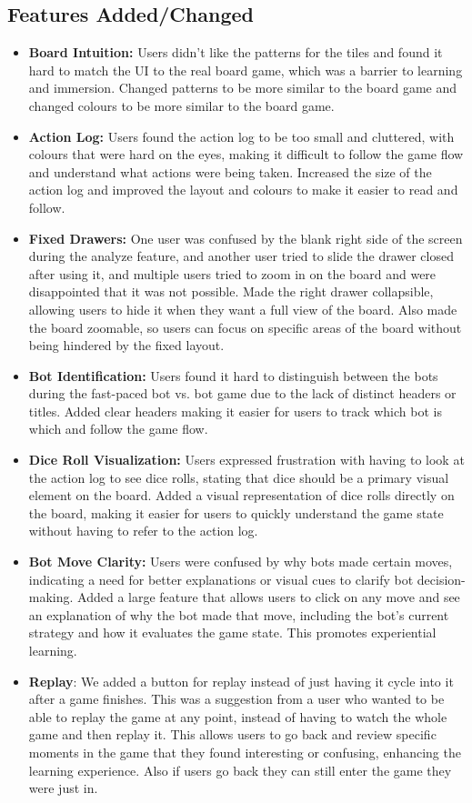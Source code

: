 \documentclass[12pt]{article}
\begin{document}
\subsection{Features Added/Changed}
\begin{itemize}
    \item \textbf{Board Intuition:} Users didn't like the patterns for the tiles and found it hard to match the UI to the real board game, which was a barrier to learning and immersion.
    \subitem Changed patterns to be more similar to the board game and changed colours to be more similar to the board game.
    \item \textbf{Action Log:} Users found the action log to be too small and cluttered, with colours that were hard on the eyes, making it difficult to follow the game flow and understand what actions were being taken.
    \subitem Increased the size of the action log and improved the layout and colours to make it easier to read and follow.
    \item \textbf{Fixed Drawers:} One user was confused by the blank right side of the screen during the analyze feature, and another user tried to slide the drawer closed after using it, and multiple users tried to zoom in on the board and were disappointed that it was not possible. 
    \subitem Made the right drawer collapsible, allowing users to hide it when they want a full view of the board. Also made the board zoomable, so users can focus on specific areas of the board without being hindered by the fixed layout.
    \item \textbf{Bot Identification:} Users found it hard to distinguish between the bots during the fast-paced bot vs. bot game due to the lack of distinct headers or titles.
    \subitem Added clear headers making it easier for users to track which bot is which and follow the game flow.
    \item  \textbf{Dice Roll Visualization:} Users expressed frustration with having to look at the action log to see dice rolls, stating that dice should be a primary visual element on the board.
    \subitem Added a visual representation of dice rolls directly on the board, making it easier for users to quickly understand the game state without having to refer to the action log.
    \item \textbf{Bot Move Clarity:} Users were confused by why bots made certain moves, indicating a need for better explanations or visual cues to clarify bot decision-making.
    \subitem Added a large feature that allows users to click on any move and see an explanation of why the bot made that move, including the bot's current strategy and how it evaluates the game state. This promotes experiential learning.
    \item \textbf{Replay}: We added a button for replay instead of just having it cycle into it after a game finishes. 
    \subitem This was a suggestion from a user who wanted to be able to replay the game at any point, instead of having to watch the whole game and then replay it. This allows users to go back and review specific moments in the game that they found interesting or confusing, enhancing the learning experience. Also if users go back they can still enter the game they were just in.
\end{itemize}
\end{document}
